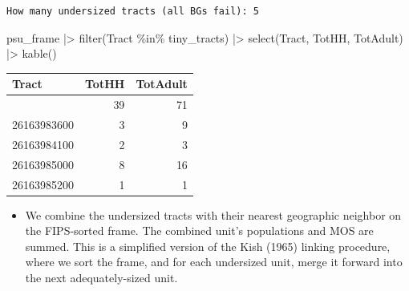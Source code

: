 \documentclass[
  11pt,
]{article}
\newenvironment{Shaded}{\begin{snugshade}}{\end{snugshade}}
\newcommand{\FunctionTok}[1]{\textcolor[rgb]{0.28,0.35,0.67}{#1}}
\newcommand{\NormalTok}[1]{\textcolor[rgb]{0.00,0.23,0.31}{#1}}
\newcommand{\SpecialCharTok}[1]{\textcolor[rgb]{0.37,0.37,0.37}{#1}}
\providecommand{\tightlist}{%
  \setlength{\itemsep}{0pt}\setlength{\parskip}{0pt}}\usepackage{longtable,booktabs,array}
\begin{document}
\begin{verbatim}
How many undersized tracts (all BGs fail): 5 
\end{verbatim}

\begin{Shaded}
\begin{Highlighting}[]
\NormalTok{psu\_frame }\SpecialCharTok{|\textgreater{}} \FunctionTok{filter}\NormalTok{(Tract }\SpecialCharTok{\%in\%}\NormalTok{ tiny\_tracts) }\SpecialCharTok{|\textgreater{}}
  \FunctionTok{select}\NormalTok{(Tract, TotHH, TotAdult) }\SpecialCharTok{|\textgreater{}} 
  \FunctionTok{kable}\NormalTok{()}
\end{Highlighting}
\end{Shaded}

\begin{longtable}[]{@{}lrr@{}}
\toprule\noalign{}
Tract & TotHH & TotAdult \\
\midrule\noalign{}
\endhead
\bottomrule\noalign{}
\endlastfoot
26163524500 & 39 & 71 \\
26163983600 & 3 & 9 \\
26163984100 & 2 & 3 \\
26163985000 & 8 & 16 \\
26163985200 & 1 & 1 \\
\end{longtable}

\newpage

\begin{itemize}
\tightlist
\item
  We combine the undersized tracts with their nearest geographic
  neighbor on the FIPS-sorted frame. The combined unit's populations and
  MOS are summed. This is a simplified version of the Kish (1965)
  linking procedure, where we sort the frame, and for each undersized
  unit, merge it forward into the next adequately-sized unit.
\end{itemize}
\end{document}
